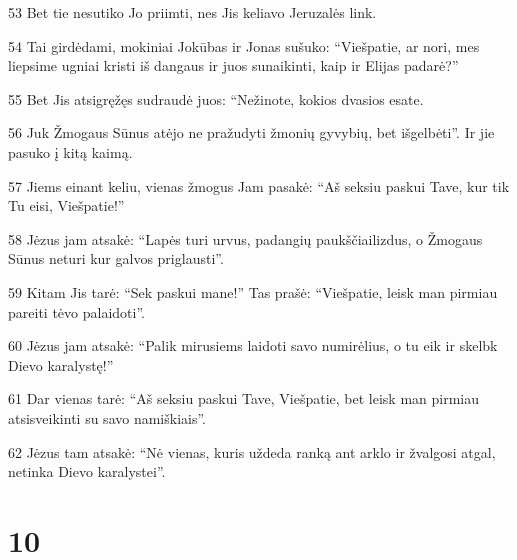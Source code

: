 \par 53 Bet tie nesutiko Jo priimti, nes Jis keliavo Jeruzalės link. 
\par 54 Tai girdėdami, mokiniai Jokūbas ir Jonas sušuko: “Viešpatie, ar nori, mes liepsime ugniai kristi iš dangaus ir juos sunaikinti, kaip ir Elijas padarė?” 
\par 55 Bet Jis atsigręžęs sudraudė juos: “Nežinote, kokios dvasios esate. 
\par 56 Juk Žmogaus Sūnus atėjo ne pražudyti žmonių gyvybių, bet išgelbėti”. Ir jie pasuko į kitą kaimą. 
\par 57 Jiems einant keliu, vienas žmogus Jam pasakė: “Aš seksiu paskui Tave, kur tik Tu eisi, Viešpatie!” 
\par 58 Jėzus jam atsakė: “Lapės turi urvus, padangių paukščiai­lizdus, o Žmogaus Sūnus neturi kur galvos priglausti”. 
\par 59 Kitam Jis tarė: “Sek paskui mane!” Tas prašė: “Viešpatie, leisk man pirmiau pareiti tėvo palaidoti”. 
\par 60 Jėzus jam atsakė: “Palik mirusiems laidoti savo numirėlius, o tu eik ir skelbk Dievo karalystę!” 
\par 61 Dar vienas tarė: “Aš seksiu paskui Tave, Viešpatie, bet leisk man pirmiau atsisveikinti su savo namiškiais”. 
\par 62 Jėzus tam atsakė: “Nė vienas, kuris uždeda ranką ant arklo ir žvalgosi atgal, netinka Dievo karalystei”.



\chapter{10}


